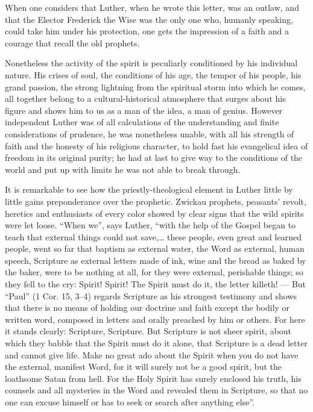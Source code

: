 \documentclass[12pt,a4paper,openany]{book}
\newcommand{\opage}[1]{\marginnote{\footnotesize\textit{[#1]}}}
\begin{document}
When one considers that Luther, when he wrote
this letter, was an outlaw, and that the Elector Frederick
the Wise was the only one who, humanly speaking, could
take him under his protection, one gets the impression
of a faith and a courage that recall the old
prophets.

\setcounter{footnote}{0}%
\opage{75}Nonetheless the activity of the spirit is peculiarly
conditioned by his individual nature. His
crises of soul, the conditions of his age, the temper of his people,
his grand passion, the strong lightning from
the spiritual storm into which he comes, all together
belong to a cultural-historical atmosphere that surges about
his figure and shows him to us as a man of the idea,
a man of genius. However independent Luther was of
all calculations of the understanding and finite considerations of prudence,
he was nonetheless unable, with all his strength of faith and
the honesty of his religious character, to hold fast his
evangelical idea of freedom in its original purity;
he had at last to give way to the conditions of the world and
put up with limits he was not able
to break through.

It is remarkable to see how the priestly-theological
element in Luther little by little gains preponderance
over the prophetic. Zwickau prophets, peasants' revolt,
heretics and enthusiasts of every color showed by
clear signs that the wild spirits were let loose. ``When
we'', says Luther, ``with the help of the Gospel began
to teach that external things could not save,\dots{}
these people, even great and learned people, went so far
that baptism as external water, the Word as external,
human speech, Scripture as external
letters made of ink, wine and the bread as baked by
the baker, were to be nothing at all, for they were external,
perishable things; so they fell to the cry:
Spirit! Spirit! The Spirit must do it, the letter killeth!
--- But ``Paul'' (1 Cor. 15, 3--4) regards
Scripture as his strongest testimony and shows that there
is no means of holding our doctrine and faith except
\setcounter{footnote}{0}%
\opage{76}the bodily or written word, composed in letters
and orally preached by him or others.
For here it stands clearly: Scripture, Scripture. But Scripture is
not sheer spirit, about which they babble that the Spirit must
do it alone, that Scripture is a dead letter and cannot
give life. Make no great ado about the Spirit
when you do not have the external, manifest Word, for it
will surely not be a good spirit, but the loathsome Satan
from hell. For the Holy Spirit has surely enclosed
his truth, his counsels and all mysteries in the Word
and revealed them in Scripture, so that no one can excuse
himself or has to seek or search after anything
else''.
\end{document}
